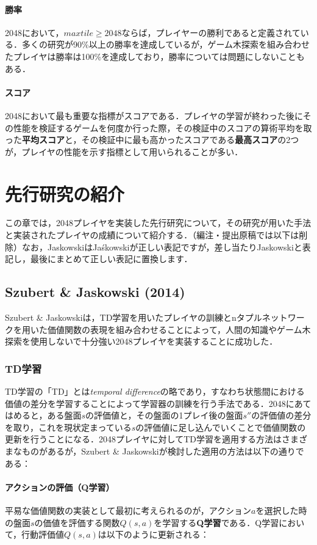 \documentclass{suribt}
\begin{document}
\subsubsection{勝率}
2048において，$max tile \geq 2048$ならば，プレイヤーの勝利であると定義されている．多くの研究が90\%以上の勝率を達成しているが，ゲーム木探索を組み合わせたプレイヤは勝率は100\%を達成しており，勝率については問題にしないこともある．

\subsubsection{スコア}
2048において最も重要な指標がスコアである．プレイヤの学習が終わった後にその性能を検証するゲームを何度か行った際，その検証中のスコアの算術平均を取った\textbf{平均スコア}と，その検証中に最も高かったスコアである\textbf{最高スコア}の2つが，プレイヤの性能を示す指標として用いられることが多い．

\chapter{先行研究の紹介}
この章では，2048プレイヤを実装した先行研究について，その研究が用いた手法と実装されたプレイヤの成績について紹介する．（編注・提出原稿では以下は削除）なお，JaskowskiはJa\'{s}kowskiが正しい表記ですが，差し当たりJaskowskiと表記し，最後にまとめて正しい表記に置換します．

\section{Szubert \& Jaskowski (2014)}
Szubert \& Jaskowskiは，TD学習を用いたプレイヤの訓練とnタプルネットワークを用いた価値関数の表現を組み合わせることによって，人間の知識やゲーム木探索を使用しないで十分強い2048プレイヤを実装することに成功した．
\subsection{TD学習}
TD学習の「TD」とは\emph{temporal difference}の略であり，すなわち状態間における価値の差分を学習することによって学習器の訓練を行う手法である．2048にあてはめると，ある盤面$s$の評価値と，その盤面の1プレイ後の盤面$s''$の評価値の差分を取り，これを現状定まっている$s$の評価値に足し込んでいくことで価値関数の更新を行うことになる．2048プレイヤに対してTD学習を適用する方法はさまざまなものがあるが，Szubert \& Jaskowskiが検討した適用の方法は以下の通りである：

\subsubsection{アクションの評価（Q学習）}
平易な価値関数の実装として最初に考えられるのが，アクション$a$を選択した時の盤面$s$の価値を評価する関数$Q(s,a)$を学習する\textbf{Q学習}である．Q学習において，行動評価値$Q(s,a)$は以下のように更新される：
\end{document}
